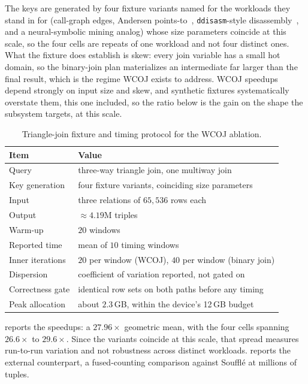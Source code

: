 The keys are generated by four fixture variants named for the workloads they stand in for (call-graph edges, Andersen points-to~\cite{andersen1994}, \texttt{ddisasm}-style disassembly~\cite{ddisasm}, and a neural-symbolic mining analog) whose size parameters coincide at this scale, so the four cells are repeats of one workload and not four distinct ones. What the fixture does establish is skew: every join variable has a small hot domain, so the binary-join plan materializes an intermediate far larger than the final result, which is the regime WCOJ exists to address. WCOJ speedups depend strongly on input size and skew, and synthetic fixtures systematically overstate them, this one included, so the ratio below is the gain on the shape the subsystem targets, at this scale.

\begin{table}[htbp]
  \centering
  \caption{Triangle-join fixture and timing protocol for the WCOJ ablation.}
  \label{tab:wcoj-protocol}
  \small
  \begin{tabularx}{\linewidth}{@{}l L@{}}
    \toprule
    \textbf{Item} & \textbf{Value} \\
    \midrule
    Query              & three-way triangle join, one multiway join \\
    Key generation     & four fixture variants, coinciding size parameters \\
    Input              & three relations of $65{,}536$ rows each \\
    Output             & ${\approx}4.19$M triples \\
    Warm-up            & $20$ windows \\
    Reported time      & mean of $10$ timing windows \\
    Inner iterations   & $20$ per window (WCOJ), $40$ per window (binary join) \\
    Dispersion         & coefficient of variation reported, not gated on \\
    Correctness gate   & identical row sets on both paths before any timing \\
    Peak allocation    & about $2.3$\,GB, within the device's 12\,GB budget \\
    \bottomrule
  \end{tabularx}
\end{table}

 reports the speedups: a $27.96\times$ geometric mean, with the four cells spanning $26.6\times$ to $29.6\times$. Since the variants coincide at this scale, that spread measures run-to-run variation and not robustness across distinct workloads.  reports the external counterpart, a fused-counting comparison against Soufflé at millions of tuples.

